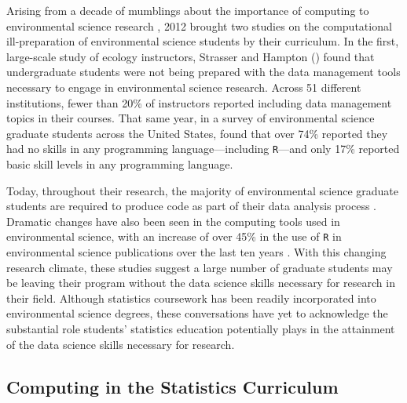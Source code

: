 \documentclass[12pt]{article}
\begin{document}
\noindent Arising from a decade of mumblings about the importance of computing
to environmental science research \citep{andelman, dodds1, dodds2, eglen, 
green, hastings, kelling, wilson-software-carpentry, wilson, wing}, 2012 brought
two studies on the computational ill-preparation of environmental science 
students by their curriculum. In the first, large-scale study of ecology
instructors, Strasser and Hampton (\citeyear{labs}) found that undergraduate
students were not being prepared with the data management tools necessary to
engage in environmental science research. Across 51 different institutions, 
fewer than 20\% of instructors reported including data management topics in
their courses. That same year, in a survey of environmental science graduate
students across the United States, \citet{hernandez} found that over 74\%
reported they had no skills in any programming language---including 
\texttt{R}---and only 17\% reported basic skill levels in any programming
language. 

\quad Today, throughout their research, the majority of environmental science
graduate students are required to produce code as part of their data analysis
process \citep{mislan}. Dramatic changes have also been seen in the 
computing tools used in environmental science, with an increase of over 45\% in
the use of \texttt{R} in environmental science publications over the last ten 
years \citep{Rpopular}. With this changing research climate, these studies
suggest a large number of graduate students may be leaving their program without
the data science skills necessary for research in their field. Although 
statistics coursework has been readily incorporated into environmental science
degrees, these conversations have yet to acknowledge the substantial role
students' statistics education potentially plays in the attainment of the data
science skills necessary for research.


\subsection{Computing in the Statistics Curriculum}
\end{document}
